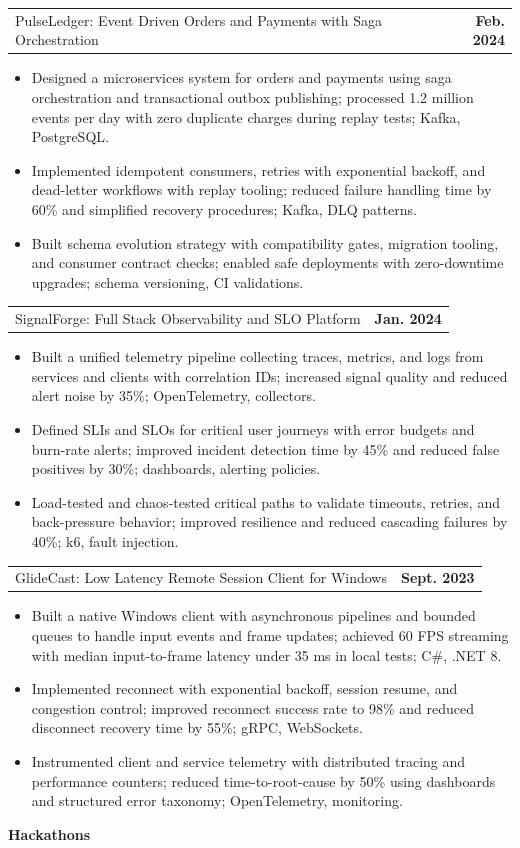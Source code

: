 \documentclass[letterpaper,10pt]{article}
\makeatletter
\newcommand{\resumeItem}[1]{\item\small{#1 \vspace{-2pt}}}
\newcommand{\resumeProjectHeading}[2]{
  \item
  \begin{tabular*}{1.001\textwidth}{l@{\extracolsep{\fill}}r}
    \small #1 & \textbf{\small #2}\\
  \end{tabular*}\vspace{-7pt}
}
\newcommand{\resumeItemListStart}{\begin{itemize}[leftmargin=0.15in]\setlength\itemsep{2pt}}
\newcommand{\resumeItemListEnd}{\end{itemize}\vspace{-5pt}}
\makeatother
\begin{document}
\resumeProjectHeading{PulseLedger: Event Driven Orders and Payments with Saga Orchestration }{Feb. 2024}
\resumeItemListStart
  \resumeItem{Designed a microservices system for orders and payments using saga orchestration and transactional outbox publishing; processed 1.2 million events per day with zero duplicate charges during replay tests; Kafka, PostgreSQL.}
  \resumeItem{Implemented idempotent consumers, retries with exponential backoff, and dead-letter workflows with replay tooling; reduced failure handling time by 60\% and simplified recovery procedures; Kafka, DLQ patterns.}
  \resumeItem{Built schema evolution strategy with compatibility gates, migration tooling, and consumer contract checks; enabled safe deployments with zero-downtime upgrades; schema versioning, CI validations.}
\resumeItemListEnd

\resumeProjectHeading{SignalForge: Full Stack Observability and SLO Platform }{Jan. 2024}
\resumeItemListStart
  \resumeItem{Built a unified telemetry pipeline collecting traces, metrics, and logs from services and clients with correlation IDs; increased signal quality and reduced alert noise by 35\%; OpenTelemetry, collectors.}
  \resumeItem{Defined SLIs and SLOs for critical user journeys with error budgets and burn-rate alerts; improved incident detection time by 45\% and reduced false positives by 30\%; dashboards, alerting policies.}
  \resumeItem{Load-tested and chaos-tested critical paths to validate timeouts, retries, and back-pressure behavior; improved resilience and reduced cascading failures by 40\%; k6, fault injection.}
\resumeItemListEnd

\resumeProjectHeading{GlideCast: Low Latency Remote Session Client for Windows }{Sept. 2023}
\resumeItemListStart
  \resumeItem{Built a native Windows client with asynchronous pipelines and bounded queues to handle input events and frame updates; achieved 60 FPS streaming with median input-to-frame latency under 35 ms in local tests; C\#, .NET 8.}
  \resumeItem{Implemented reconnect with exponential backoff, session resume, and congestion control; improved reconnect success rate to 98\% and reduced disconnect recovery time by 55\%; gRPC, WebSockets.}
  \resumeItem{Instrumented client and service telemetry with distributed tracing and performance counters; reduced time-to-root-cause by 50\% using dashboards and structured error taxonomy; OpenTelemetry, monitoring.}
\resumeItemListEnd

\vspace{2pt}
\resumeItem{\textbf{Hackathons}}
\vspace{-2pt}
\end{document}
